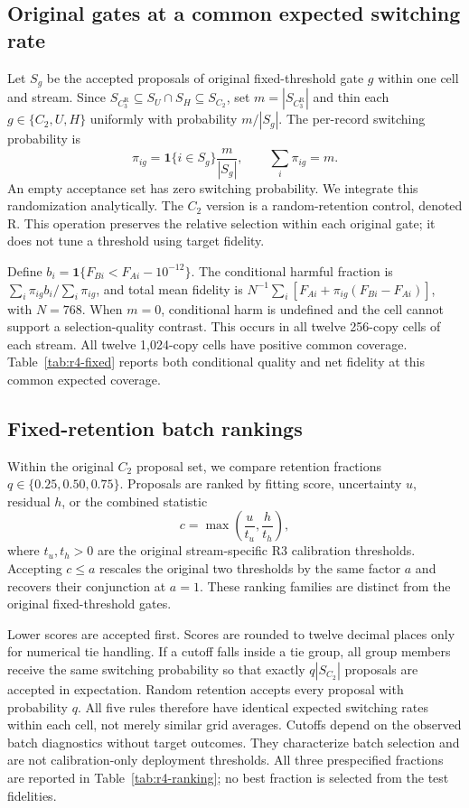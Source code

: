 \documentclass[11pt]{article}
\numberwithin{equation}{section}
\begin{document}
\subsection{Original gates at a common expected switching rate}

Let $S_g$ be the accepted proposals of original fixed-threshold gate $g$
within one cell and stream.  Since
$S_{C_3^{\mathrm R}}\subseteq S_U\cap S_H\subseteq S_{C_2}$, set
$m=|S_{C_3^{\mathrm R}}|$ and thin each $g\in\{C_2,U,H\}$ uniformly
with probability $m/|S_g|$.  The per-record switching probability is
\begin{equation}
\pi_{ig}=\mathbf1\{i\in S_g\}\frac{m}{|S_g|},
\qquad \sum_i\pi_{ig}=m.
\end{equation}
An empty acceptance set has zero switching probability.  We integrate this
randomization analytically.  The $C_2$ version is a random-retention control,
denoted R.  This operation preserves the relative selection within each
original gate; it does not tune a threshold using target fidelity.

Define $b_i=\mathbf1\{F_{Bi}<F_{Ai}-10^{-12}\}$.  The conditional harmful
fraction is $\sum_i\pi_{ig}b_i/\sum_i\pi_{ig}$, and total mean fidelity
is $N^{-1}\sum_i[F_{Ai}+\pi_{ig}(F_{Bi}-F_{Ai})]$, with $N=768$.
When $m=0$, conditional harm is undefined and the cell cannot support a
selection-quality contrast.  This occurs in all twelve 256-copy cells of
each stream.  All twelve 1,024-copy cells have positive common coverage.
Table~\ref{tab:r4-fixed} reports both conditional quality and net fidelity
at this common expected coverage.

\subsection{Fixed-retention batch rankings}

Within the original $C_2$ proposal set, we compare retention fractions
$q\in\{0.25,0.50,0.75\}$.  Proposals are ranked by fitting score,
uncertainty $u$, residual $h$, or the combined statistic
\begin{equation}
c=\max\left(\frac{u}{t_u},\frac{h}{t_h}\right),
\end{equation}
where $t_u,t_h>0$ are the original stream-specific R3 calibration thresholds.
Accepting $c\leq a$ rescales the original two thresholds by the same
factor $a$ and recovers their conjunction at $a=1$.  These ranking
families are distinct from the original fixed-threshold gates.

Lower scores are accepted first.  Scores are rounded to twelve decimal
places only for numerical tie handling.  If a cutoff falls inside a tie
group, all group members receive the same switching probability so that
exactly $q|S_{C_2}|$ proposals are accepted in expectation.  Random retention
accepts every proposal with probability $q$.  All five rules therefore
have identical expected switching rates within each cell, not merely similar
grid averages.  Cutoffs depend on the observed batch diagnostics without
target outcomes.  They characterize batch selection and are not
calibration-only deployment thresholds.  All three prespecified fractions
are reported in Table~\ref{tab:r4-ranking}; no best fraction is selected
from the test fidelities.
\end{document}
